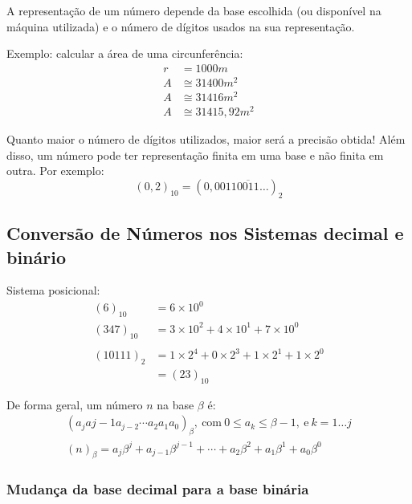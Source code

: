 \documentclass{article}
\begin{document}
        A representação de um número depende da base escolhida (ou disponível na máquina utilizada) e o número de dígitos usados na sua representação.

        Exemplo: calcular a área de uma circunferência:
        \begin{align*}
            r &= 1000 m\\
            A &\cong 31400 m^2\\
            A &\cong 31416 m^2\\
            A &\cong 31415,92 m^2
        \end{align*}

        Quanto maior o número de dígitos utilizados, maior será a precisão obtida! Além disso, um número pode ter representação finita em uma base e não finita em outra. Por exemplo:
        \[{(0,2)}_{10} = {(0,0011\overline{0011}\ldots)}_2\]

    \subsection{Conversão de Números nos Sistemas decimal e binário}

        Sistema posicional:
        \begin{align*}
            {(6)}_{10} &= 6\times10^0\\
            {(347)}_{10} &= 3\times10^2 + 4\times10^1 + 7\times10^0\\\\
            {(10111)}_2 &= 1\times2^4 + 0\times2^3 + 1\times2^1 + 1\times2^0\\
            &= {(23)}_{10}
        \end{align*}

        De forma geral, um número $n$ na base $\beta$ é:
        \begin{gather*}
            {(a_j a{j-1} a_{j-2} \cdots a_2 a_1 a_0)}_{\beta},~\mathrm{com}~0 \leq a_k \leq \beta - 1,~\mathrm{e}~k = 1 \ldots j\\
            {(n)}_{\beta}= a_j\beta^j + a_{j-1}\beta^{j-1} + \cdots + a_2\beta^2 + a_1\beta^1 + a_0\beta^0 
        \end{gather*}

        \subsubsection{Mudança da base decimal para a base binária}
\end{document}
